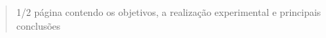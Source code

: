 \begin{abstract}
    1/2 página contendo os objetivos, a realização experimental e principais conclusões
\end{abstract}